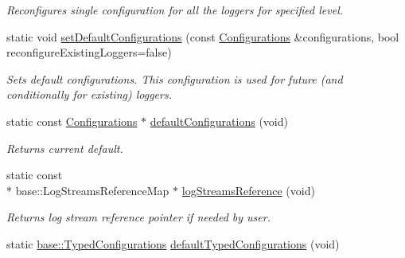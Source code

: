 \begin{DoxyCompactItemize}
\begin{DoxyCompactList}\small\item\em Reconfigures single configuration for all the loggers for specified level. \end{DoxyCompactList}\item 
\hypertarget{classel_1_1Loggers_ab9fb62a8ff904ff887fefde3282f46a4}{static void \hyperlink{classel_1_1Loggers_ab9fb62a8ff904ff887fefde3282f46a4}{set\-Default\-Configurations} (const \hyperlink{classel_1_1Configurations}{Configurations} \&configurations, bool reconfigure\-Existing\-Loggers=false)}\label{classel_1_1Loggers_ab9fb62a8ff904ff887fefde3282f46a4}

\begin{DoxyCompactList}\small\item\em Sets default configurations. This configuration is used for future (and conditionally for existing) loggers. \end{DoxyCompactList}\item 
\hypertarget{classel_1_1Loggers_a96f2336fafdc3ef2c4df01a73ae5ffb7}{static const \hyperlink{classel_1_1Configurations}{Configurations} $\ast$ \hyperlink{classel_1_1Loggers_a96f2336fafdc3ef2c4df01a73ae5ffb7}{default\-Configurations} (void)}\label{classel_1_1Loggers_a96f2336fafdc3ef2c4df01a73ae5ffb7}

\begin{DoxyCompactList}\small\item\em Returns current default. \end{DoxyCompactList}\item 
\hypertarget{classel_1_1Loggers_ad17312c9474d94bc98efcaf08ca279a4}{static const \\*
base\-::\-Log\-Streams\-Reference\-Map $\ast$ \hyperlink{classel_1_1Loggers_ad17312c9474d94bc98efcaf08ca279a4}{log\-Streams\-Reference} (void)}\label{classel_1_1Loggers_ad17312c9474d94bc98efcaf08ca279a4}

\begin{DoxyCompactList}\small\item\em Returns log stream reference pointer if needed by user. \end{DoxyCompactList}\item 
\hypertarget{classel_1_1Loggers_af296007c3eb3b71602ec80ff59875b46}{static \hyperlink{classel_1_1base_1_1TypedConfigurations}{base\-::\-Typed\-Configurations} \hyperlink{classel_1_1Loggers_af296007c3eb3b71602ec80ff59875b46}{default\-Typed\-Configurations} (void)}\label{classel_1_1Loggers_af296007c3eb3b71602ec80ff59875b46}


\end{DoxyCompactItemize}
